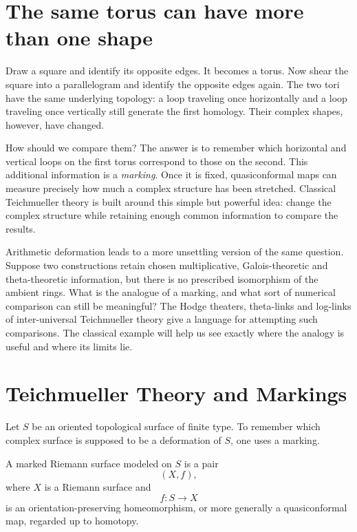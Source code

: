 
\section{The same torus can have more than one shape}

Draw a square and identify its opposite edges. It becomes a torus. Now shear the square into a parallelogram and identify the opposite edges again. The two tori have the same underlying topology: a loop traveling once horizontally and a loop traveling once vertically still generate the first homology. Their complex shapes, however, have changed.

How should we compare them? The answer is to remember which horizontal and vertical loops on the first torus correspond to those on the second. This additional information is a \emph{marking}. Once it is fixed, quasiconformal maps can measure precisely how much a complex structure has been stretched. Classical Teichmueller theory is built around this simple but powerful idea: change the complex structure while retaining enough common information to compare the results.

Arithmetic deformation leads to a more unsettling version of the same question. Suppose two constructions retain chosen multiplicative, Galois-theoretic and theta-theoretic information, but there is no prescribed isomorphism of the ambient rings. What is the analogue of a marking, and what sort of numerical comparison can still be meaningful? The Hodge theaters, theta-links and log-links of inter-universal Teichmueller theory give a language for attempting such comparisons. The classical example will help us see exactly where the analogy is useful and where its limits lie.

\section{Teichmueller Theory and Markings}

Let \(S\) be an oriented topological surface of finite type.  To remember which complex surface is supposed to be a deformation of \(S\), one uses a marking.

\begin{definition}
A marked Riemann surface modeled on \(S\) is a pair
\[
  (X,f),
\]
where \(X\) is a Riemann surface and
\[
  f:S\longrightarrow X
\]
is an orientation-preserving homeomorphism, or more generally a quasiconformal map, regarded up to homotopy.
\end{definition}

